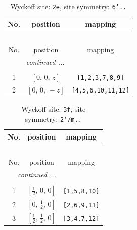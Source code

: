 \documentclass[fleqn,8pt]{jsarticle}
\begin{document}
\begin{longtable}{ccc}
\caption{Wyckoff site: {\tt 2e}, site symmetry: {\tt 6'..}}
 \\
 \hline \hline
No. & position & mapping \\ \hline \endfirsthead

\multicolumn{2}{l}{\tablename\ \thetable{}} \\
 \hline \hline
No. & position & mapping \\ \hline \endhead

 \hline \hline
\multicolumn{2}{r}{\footnotesize\it continued ...} \\ \endfoot

 \hline \hline
\multicolumn{2}{r}{} \\ \endlastfoot

1 & $\left[ 0,\, 0,\, z \right]$ & {\tt [1,2,3,7,8,9]} \\ \hline
2 & $\left[ 0,\, 0,\, - z \right]$ & {\tt [4,5,6,10,11,12]} \\
\end{longtable}
\renewcommand{\arraystretch}{1.2}
\begin{longtable}{ccc}
\caption{Wyckoff site: {\tt 3f}, site symmetry: {\tt 2'/m..}}
 \\
 \hline \hline
No. & position & mapping \\ \hline \endfirsthead

\multicolumn{2}{l}{\tablename\ \thetable{}} \\
 \hline \hline
No. & position & mapping \\ \hline \endhead

 \hline \hline
\multicolumn{2}{r}{\footnotesize\it continued ...} \\ \endfoot

 \hline \hline
\multicolumn{2}{r}{} \\ \endlastfoot

1 & $\left[ \frac{1}{2},\, 0,\, 0 \right]$ & {\tt [1,5,8,10]} \\ \hline
2 & $\left[ 0,\, \frac{1}{2},\, 0 \right]$ & {\tt [2,6,9,11]} \\ \hline
3 & $\left[ \frac{1}{2},\, \frac{1}{2},\, 0 \right]$ & {\tt [3,4,7,12]} \\
\end{longtable}
\renewcommand{\arraystretch}{1.2}
\end{document}
